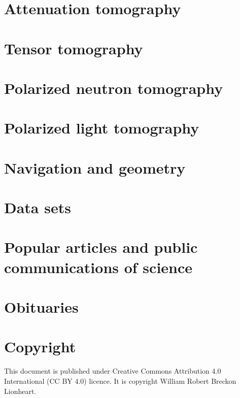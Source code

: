 \documentclass[]{article}
\begin{document}
\section{Attenuation tomography}

\section{Tensor tomography}

\section{Polarized neutron tomography}

\section{Polarized light tomography}

\section{Navigation and geometry}

\section{Data sets}

\section{Popular articles and public communications of science}

\section{Obituaries}

\section*{Copyright}
This document is published under Creative Commons Attribution 4.0 International (CC BY 4.0) licence. It is copyright \textcopyright William Robert Breckon Lionheart.



\end{document}
